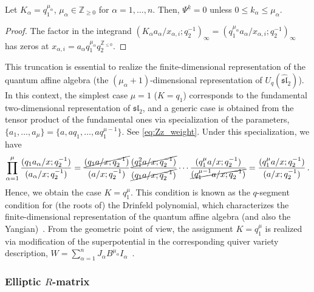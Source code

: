 \begin{proposition}\label{prop:Higgs1}
    Let $K_\alpha = q_1^{\mu_\alpha}$, $\mu_\alpha \in \mathbb{Z}_{\ge 0}$ for $\alpha = 1,\ldots,n$.
    Then, $\Psi^{\underline{k}} = 0$ unless $0 \le k_\alpha \le \mu_\alpha$.
\end{proposition}
\begin{proof}
    The factor in the integrand $(K_\alpha a_\alpha / x_{\alpha,i}; q_2^{-1})_\infty = (q_1^{\mu_\alpha} a_\alpha / x_{\alpha,i}; q_2^{-1})_\infty$ has zeros at $x_{\alpha,i} = a_\alpha q_1^{\mu_\alpha} q_2^{\mathbb{Z}_{\le 0}}$.
\end{proof}
This truncation is essential to realize the finite-dimensional representation of the quantum affine algebra (the $(\mu_\alpha+1)$-dimensional representation of $U_q(\widehat{\mathfrak{sl}}_2)$).
In this context, the simplest case $\mu = 1$ ($K = q_1$) corresponds to the fundamental two-dimensional representation of $\mathfrak{sl}_2$, and a generic case is obtained from the tensor product of the fundamental ones via specialization of the parameters, $\{a_1,\ldots,a_\mu\} = \{a, a q_1, \ldots, a q_1^{\mu-1} \}$.
See \eqref{eq:Zz_weight}.
Under this specialization, we have
\begin{align}
    \prod_{\alpha = 1}^\mu \frac{(q_1 a_\alpha/x;q_2^{-1})}{(a_\alpha/x;q_2^{-1})} = \frac{\cancel{(q_1 a /x;q_2^{-1})}}{(a /x;q_2^{-1})} \frac{\cancel{(q_1^2 a /x;q_2^{-1})}}{\cancel{(q_1 a /x;q_2^{-1})}} \cdots \frac{(q_1^{\mu} a /x;q_2^{-1})}{\cancel{(q_1^{\mu-1} a /x;q_2^{-1})}} = \frac{(q_1^\mu a /x;q_2^{-1})}{(a /x;q_2^{-1})} \, .
\end{align}
Hence, we obtain the case $K = q_1^\mu$.
This condition is known as the $q$-segment condition for (the roots of) the Drinfeld polynomial, which characterizes the finite-dimensional representation of the quantum affine algebra (and also the Yangian)~\cite{Chari:1991CMP}. 
From the geometric point of view, the assignment $K = q_1^\mu$ is realized via modification of the superpotential in the corresponding quiver variety description, $W = \sum_{\alpha = 1}^n J_\alpha B^{\mu_\alpha} I_\alpha$~\cite{Nekrasov:2009uh,Bykov:2019cst,Cao:2023lon}.

\subsubsection{Elliptic $R$-matrix}

